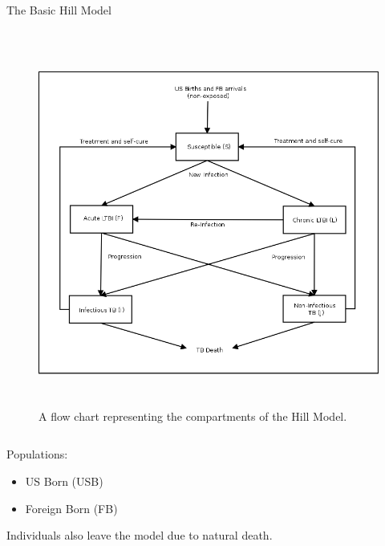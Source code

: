 \documentclass[final]{beamer}
\begin{document}
\begin{frame}
\begin{columns}
\begin{column}{.3\textwidth}
\begin{block}{The Basic Hill Model}
\begin{block}{}
\begin{column}{.5\textwidth}
\begin{figure}[h]
\begin{center}
                \includegraphics[height=12cm,width=.9\textwidth]{HillModelFlowChart}
              \end{center}
              \caption{A flow chart representing the compartments of the Hill Model.}
              \label{fig:hillFlow}
            \end{figure}
          \end{column}
          \begin{column}{.43\textwidth}
            Populations:
            \begin{itemize}
              \item US Born (USB) 
              \item Foreign Born (FB)
            \end{itemize}
            Individuals also leave the model due to natural death.
          \end{column}
          \begin{figure}[h]
            \begin{center}

\end{center}
\end{figure}
\end{block}
\end{block}
\end{column}
\end{columns}
\end{frame}
\end{document}
